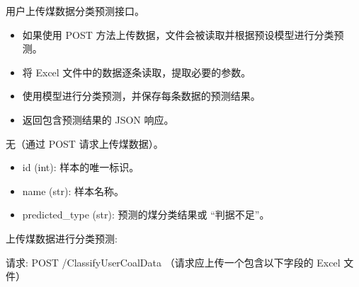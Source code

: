 \documentclass[a4paper,12pt,english]{sphinxmanual}
\begin{document}
\begin{fulllineitems}
\label{\detokenize{api/login:login.ClassifyUserCoalData}}
\pysigstartsignatures
{}
\pysigstopsignatures
\sphinxAtStartPar
用户上传煤数据分类预测接口。
\begin{description}
\begin{itemize}
\item {} 
\sphinxAtStartPar
如果使用 POST 方法上传数据，文件会被读取并根据预设模型进行分类预测。

\item {} 
\sphinxAtStartPar
将 Excel 文件中的数据逐条读取，提取必要的参数。

\item {} 
\sphinxAtStartPar
使用模型进行分类预测，并保存每条数据的预测结果。

\item {} 
\sphinxAtStartPar
返回包含预测结果的 JSON 响应。

\end{itemize}

\sphinxAtStartPar
无（通过 POST 请求上传煤数据）。

\begin{description}
\begin{itemize}
\item {} 
\sphinxAtStartPar
id (int): 样本的唯一标识。

\item {} 
\sphinxAtStartPar
name (str): 样本名称。

\item {} 
\sphinxAtStartPar
predicted\_type (str): 预测的煤分类结果或 “判据不足”。

\end{itemize}

\end{description}

\sphinxAtStartPar
上传煤数据进行分类预测:

\begin{sphinxVerbatim}[commandchars=\\\{\}]
请求:
POST /ClassifyUserCoalData
（请求应上传一个包含以下字段的 Excel 文件）


\end{sphinxVerbatim}
\end{description}
\end{fulllineitems}
\end{document}
